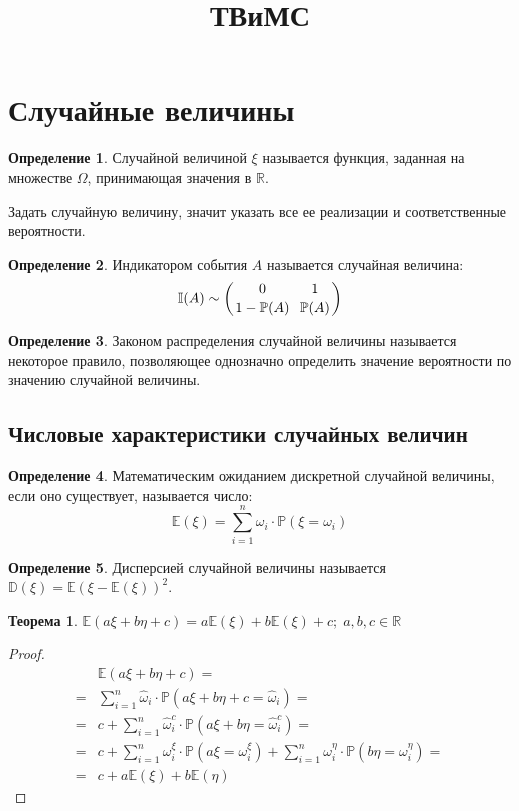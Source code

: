 \documentclass[12pt]{article}
\title{\textbf{ТВиМС}}\date{}\author{}
\theoremstyle{definition}
\newtheorem{theorem}{Теорема}[section]
\newtheorem{definition}{Определение}
\newcommand{\R}{\mathbb{R}}
\newcommand{\I}{\mathbb{I}}
\newcommand{\E}{\mathbb{E}}
\newcommand{\D}{\mathbb{D}}
\newcommand{\prob}{\mathbb{P}}
\begin{document}
\maketitle
\tableofcontents
\label{toc}
\newpage

\section{Случайные величины}

\begin{definition}
    Случайной величиной $\xi$ называется функция, заданная на множестве $\Omega$, принимающая значения в $\R$.
\end{definition}

    Задать случайную величину, значит указать все ее реализации и соответственные вероятности.

\begin{definition}
    Индикатором события $A$ называется случайная величина: $$\I(A)\sim \left(\genfrac{}{}{0pt}{0}{0}{1-\prob(A)}\,\,\, \genfrac{}{}{0pt}{0}{1}{\prob(A)} \right)$$
\end{definition}

\begin{definition}
    Законом распределения случайной величины называется некоторое правило, позволяющее однозначно определить значение вероятности по значению случайной величины.
\end{definition}

    \subsection{Числовые характеристики случайных величин}

\begin{definition}
    Математическим ожиданием дискретной случайной величины, если оно существует, называется число: 
    $$\E (\xi)=\sum_{i=1}^{n}\omega_i\cdot \prob(\xi=\omega_i)$$
\end{definition}

\begin{definition}
    Дисперсией случайной величины называется $\D(\xi)=\E(\xi-\E(\xi))^2$.
\end{definition}

\begin{theorem}
    $\E(a\xi+b\eta+c)=a\E(\xi)+b\E(\xi)+c;\;a,b,c\in \R$
\end{theorem}

\begin{proof}
    \begin{align*}
        &\E(a\xi+b\eta+c)=\\
        =&\sum_{i=1}^n \widehat{\omega}_i\cdot\prob(a\xi+b\eta+c=\widehat{\omega}_i)=\\
        =&c+\sum_{i=1}^n \widehat{\omega}_i^c\cdot\prob(a\xi+b\eta=\widehat{\omega}_i^c)=\\
        =&c+\sum_{i=1}^n \omega_i^\xi\cdot \prob(a\xi=\omega_i^\xi)+\sum_{i=1}^n \omega_i^\eta\cdot\prob(b\eta=\omega_i^\eta)=\\            =&c+a\E(\xi)+b\E(\eta)
    \end{align*}
\end{proof}
\end{document}
